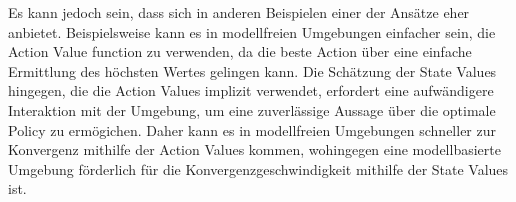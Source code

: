 \documentclass[11pt]{article}
\begin{document}
Es kann jedoch sein, dass sich in anderen Beispielen einer der Ansätze eher anbietet. Beispielsweise kann es in modellfreien Umgebungen einfacher sein, die Action Value function zu verwenden, da die beste Action über eine einfache Ermittlung des höchsten Wertes gelingen kann. Die Schätzung der State Values hingegen, die die Action Values implizit verwendet, erfordert eine aufwändigere Interaktion mit der Umgebung, um eine zuverlässige Aussage über die optimale Policy zu ermögichen. Daher kann es in modellfreien Umgebungen schneller zur Konvergenz mithilfe der Action Values kommen, wohingegen eine modellbasierte Umgebung förderlich für die Konvergenzgeschwindigkeit mithilfe der State Values ist.
\end{document}
